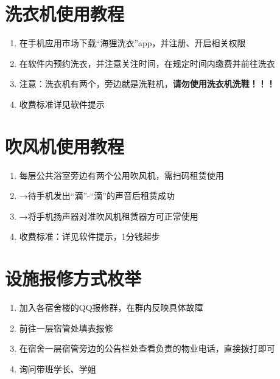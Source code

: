\section[洗衣机使用教程]{洗衣机使用教程}
\begin{enumerate}
    \item 在手机应用市场下载“海狸洗衣”app，并注册、开启相关权限
    \item 在软件内预约洗衣，并注意关注时间，在规定时间内缴费并前往洗衣
    \item 注意：洗衣机有两个，旁边就是洗鞋机，\textbf{请勿使用洗衣机洗鞋！！！}
    \item 收费标准详见软件提示
\end{enumerate}

\section[吹风机使用教程]{吹风机使用教程}
\label{dry_machine}
\begin{enumerate}
    \item 每层公共浴室旁边有两个公用吹风机，需扫码\footnotemark 租赁使用
    \item →待手机发出“滴”-“滴”的声音后租赁成功
    \item →将手机扬声器对准吹风机租赁器方可正常使用
    \item 收费标准：详见软件提示，1分钱起步
\end{enumerate}

\section[设施报修方式枚举]{设施报修方式枚举}
\label{repair_report}
\begin{enumerate}
    \item 加入各宿舍楼的QQ报修群，在群内反映具体故障
    \item 前往一层宿管处填表报修
    \item 在宿舍一层宿管旁边的公告栏处查看负责的物业电话，直接拨打即可
    \item 询问带班学长、学姐
\end{enumerate}

